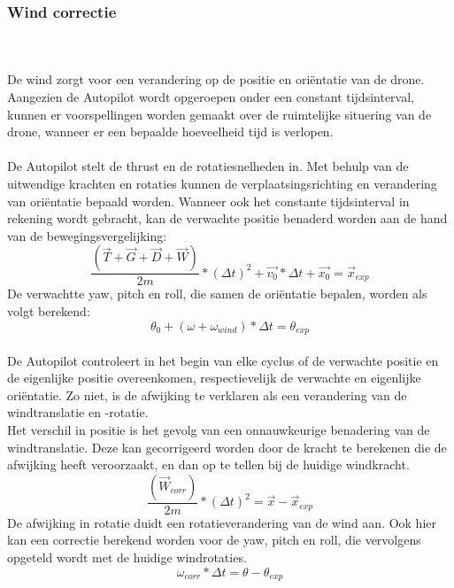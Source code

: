 \subsubsection{Wind correctie}
\\
\\
De wind zorgt voor een verandering op de positie en ori\"entatie van de drone. Aangezien de Autopilot wordt opgeroepen onder een constant tijdsinterval, kunnen er voorspellingen worden gemaakt over de ruimtelijke situering van de drone, wanneer er een bepaalde hoeveelheid tijd is verlopen.
\\
\\
De Autopilot stelt de thrust en de rotatiesnelheden in. Met behulp van de uitwendige krachten en rotaties kunnen de verplaatsingsrichting en verandering van ori\"entatie bepaald worden. Wanneer ook het constante tijdsinterval in rekening wordt gebracht, kan de verwachte positie benaderd worden aan de hand van de bewegingsvergelijking:
\begin{equation}
	 \frac{(\vec{T} + \vec{G} + \vec{D} + \vec{W}) }{2m} * (\Delta t)^2 + \vec{v_0} * \Delta t + \vec{x_0} = \vec{x}_{exp}
\end{equation}
De verwachtte yaw, pitch en roll, die samen de ori\"entatie bepalen, worden als volgt berekend:
\begin{equation}
	\theta_0 + (\omega + \omega_{wind})*\Delta t = \theta_{exp}
\end{equation}
\\
De Autopilot controleert in het begin van elke cyclus of de verwachte positie en de eigenlijke positie overeenkomen, respectievelijk de verwachte en eigenlijke ori\"entatie. Zo niet, is de afwijking te verklaren als een verandering van de windtranslatie en -rotatie. 
\\
Het verschil in positie is het gevolg van een onnauwkeurige benadering van de windtranslatie. Deze kan gecorrigeerd worden door de kracht te berekenen die de afwijking heeft veroorzaakt, en dan op te tellen bij de huidige windkracht.
\begin{equation}
	\frac{(\vec{W}_{corr}) }{2m} * (\Delta t)^2 = \vec{x}-\vec{x}_{exp}
\end{equation}
De afwijking in rotatie duidt een rotatieverandering van de wind aan. Ook hier kan een correctie berekend worden voor de yaw, pitch en roll, die vervolgens opgeteld wordt met de huidige windrotaties.
\begin{equation}
	\omega_{corr}*\Delta t = \theta-\theta_{exp}
\end{equation}